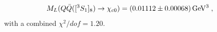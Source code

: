 \documentclass[aps,prc,preprint,superscriptaddress,showpacs,showkeys,amsmath]{revtex4-1}
\begin{document}
\begin{equation}
  \begin{split}
    M_{L}(Q{\bar{Q}}([^3S_1]_{8})\rightarrow \chi_{c0}) & 
    = (0.01112\pm {\color{black} 0.00068})\,{\rm GeV^3}\;,
    \label{eq:Mchicn1CO_val}
  \end{split}
\end{equation}
with a combined {\color{black} $\chi^2/dof=1.20$}. 
\end{document}
